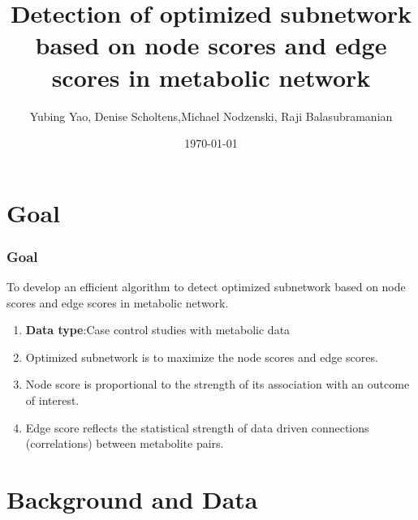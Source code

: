 \documentclass[10pt]{beamer}
\title{Detection of optimized subnetwork based on node scores and edge scores in metabolic network}
\author{Yubing Yao,  Denise Scholtens,Michael Nodzenski, Raji Balasubramanian}
\institute{University of Massachusetts, Amherst\\
	} %
\date{\today}
\begin{document}
\begin{frame}
  \titlepage
\end{frame}


\section[Outline]{}
\begin{frame}
  \tableofcontents
\end{frame}

\section{Goal}

\begin{frame}
	\frametitle{Goal}
	 To develop an efficient algorithm to detect optimized subnetwork based on node scores and edge scores in metabolic network. \pause
		\\
		\vspace{1ex}
		\begin{enumerate}
			\item<1-> \textbf{Data type}:Case control studies with metabolic data
		\item<2-> Optimized subnetwork is to maximize the node scores and edge scores.
			\item<3-> Node score is proportional to the strength of its association with an outcome of interest.
			\item<4-> Edge score reflects the statistical strength of data driven connections (correlations) between metabolite pairs.
		
	\end{enumerate}
\end{frame}

\section{Background and Data}

\end{document}
